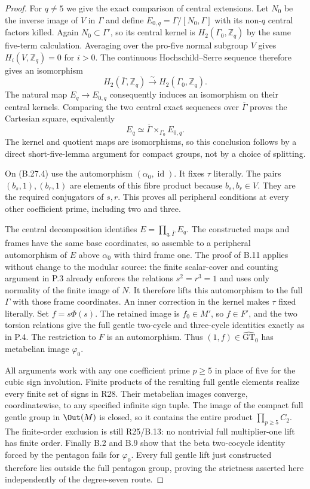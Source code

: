 \begin{proof}
For $q\ne5$ we give the exact comparison of central
extensions. Let $N_0$ be the inverse image of $V$ in
$\Gamma$ and define
$E_{0,q}=\Gamma/[N_0,\Gamma]$ with its non-$q$ central
factors killed. Again $N_0\subset\Gamma'$, so its
central kernel is $H_2(\Gamma_0,\mathbb Z_q)$ by
the same five-term calculation. Averaging over the
pro-five normal subgroup $V$ gives
$H_i(V,\mathbb Z_q)=0$ for $i>0$. The continuous
Hochschild--Serre sequence therefore gives an isomorphism
\[
 H_2(\overline\Gamma,\mathbb Z_q)
                 \xrightarrow{\sim}H_2(\Gamma_0,\mathbb Z_q).
\]
The natural map $E_q\to E_{0,q}$ consequently induces
an isomorphism on their central kernels. Comparing the
two central exact sequences over $\overline\Gamma$
proves the Cartesian square, equivalently
\[
                  E_q\simeq
             \overline\Gamma\mathbin\times_{\Gamma_0}E_{0,q}.
 \tag{B.27.4}
\]
The kernel and quotient maps are isomorphisms, so this
conclusion follows by a direct short-five-lemma argument
for compact groups, not by a choice of splitting.

On (B.27.4) use the automorphism
$(\alpha_0,\operatorname{id})$. It fixes $\tau$
literally. The pairs $(b_s,1),(b_r,1)$ are elements
of this fibre product because $b_s,b_r\in V$.
They are the required conjugators of $s,r$.
This proves all peripheral conditions at every other
coefficient prime, including two and three.

The central decomposition identifies
$E=\prod_{q,\overline\Gamma}E_q$. The constructed maps
and frames have the same base coordinates, so assemble
to a peripheral automorphism of $E$ above $\alpha_0$
with third frame one. The proof of B.11 applies without
change to the modular source: the finite scalar-cover
and counting argument in P.3 already enforces the
relations $s^2=r^3=1$ and uses only normality of the
finite image of $N$. It therefore lifts this automorphism
to the full $\Gamma$ with those frame coordinates.
An inner correction in the kernel makes $\tau$ fixed
literally. Set $f=s\Phi(s)$. The retained image is
$f_0\in M'$, so $f\in F'$, and the two torsion
relations give the full gentle two-cycle and three-cycle
identities exactly as in P.4. The restriction to $F$
is an automorphism. Thus $(1,f)\in
\widehat{\mathrm{GT}}_0$ has metabelian image
$\varphi_0$.

All arguments work with any one coefficient prime
$p\geq5$ in place of five for the cubic sign involution.
Finite products of the resulting full gentle elements
realize every finite set of signs in R28. Their
metabelian images converge, coordinatewise, to any
specified infinite sign tuple. The image of the compact
full gentle group in $\Out(M)$ is closed, so it
contains the entire product $\prod_{p\geq5}C_2$.
The finite-order exclusion is still R25/B.13: no
nontrivial full multiplier-one lift has finite order.
Finally B.2 and B.9 show that the beta two-cocycle
identity forced by the pentagon fails for $\varphi_0$.
Every full gentle lift just constructed therefore lies
outside the full pentagon group, proving the strictness
asserted here independently of the degree-seven route.
\end{proof}

